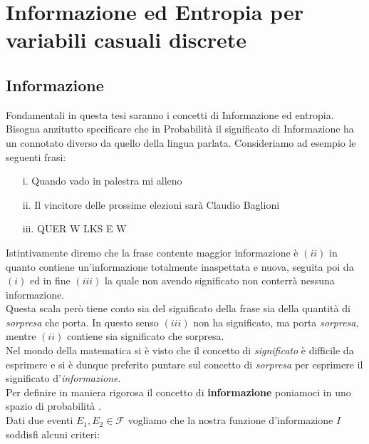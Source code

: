\chapter{Informazione ed Entropia per variabili casuali discrete}
\label{cha:intro}
\vspace{15pt}




\section{Informazione}
\label{sec:informazione}
\vspace{10pt}

Fondamentali in questa tesi saranno i concetti di Informazione ed entropia. Bisogna anzitutto specificare che in Probabilità il significato di Informazione ha un connotato diverso da quello della lingua parlata. Consideriamo ad esempio le seguenti frasi: 
\begin{enumerate}
\item[i.] Quando vado in palestra mi alleno
\item[ii.] Il vincitore delle prossime elezioni sarà Claudio Baglioni
\item[iii.] QUER W LKS E W
\end{enumerate}

Istintivamente diremo che la frase contente maggior informazione è $(ii)$ in quanto contiene un'informazione totalmente inaspettata e nuova, seguita poi da $(i)$ ed in fine $(iii)$ la quale non avendo significato non conterrà nessuna informazione.\\ Questa scala però tiene conto sia del significato della frase sia della quantità di \textit{sorpresa} che porta. In questo senso $(iii)$ non ha significato, ma porta \textit{sorpresa}, mentre $(ii)$ contiene sia significato che sorpresa.\\ Nel mondo della matematica si è visto che il concetto di \textit{significato} è difficile da esprimere e si è dunque preferito puntare sul concetto di \textit{sorpresa} per esprimere il significato d'\textit{informazione}.\\
Per definire in maniera rigorosa il concetto di \textbf{informazione} poniamoci in uno spazio di probabilità \spacep.\\
Dati due eventi $E_1,E_2 \in \mathcal{F}$ vogliamo che la nostra funzione d'informazione $I$ soddisfi alcuni criteri:


